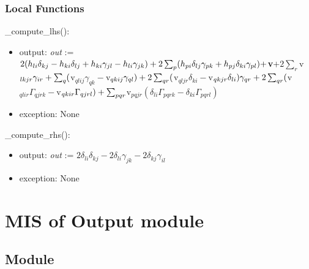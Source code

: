 \documentclass[12pt, titlepage]{article}
\begin{document}
\subsubsection{Local Functions}
\noindent \_compute\_lhs():
\begin{itemize}
	\item output: \textit{out} := \\
	$2(h_{li} \delta_{kj} - h_{ki}\delta_{lj} + h_{ki} \gamma_{jl} - h_{li} 
	\gamma_{jk})\\
	+ 2 \sum_{p} (h_{pi} \delta_{lj}\gamma_{pk} + h_{pj} 
	\delta_{ki}\gamma_{pl})\\
	+$\textbf{v}$+ 2 \sum_{r}$v$_{lkjr} \gamma_{ir} \\
	+ \sum_{q} ($v$_{qlij} \gamma_{qk} - 
	$v$_{qkij} \gamma_{ql})\\
	+ 2 \sum_{qr} ($v$_{qljr}  \delta_{ki} - $v$_{qkjr} 
	\delta_{li})\gamma_{qr}\\
	+ 2 \sum_{qr} ($v$_{qlir}\Gamma_{qjrk} - 
	$v$_{qkir}\Gamma_{qjrl})\\
	+ \sum_{pqr} $v$_{pqjr}(\delta_{li}\Gamma_{pqrk} - 
	\delta_{ki}\Gamma_{pqrl})$
	\item exception: None 
\end{itemize}

\noindent\_compute\_rhs():
\begin{itemize}
	\item output: \textit{out} := $2\delta_{li}\delta_{kj} - 
	2\delta_{li}\gamma_{jk}- 2\delta_{kj}\gamma_{il}$
	\item exception: None 
\end{itemize}

\newpage

\section{MIS of Output module} \label{mOutput} 

\subsection{Module}
\end{document}
